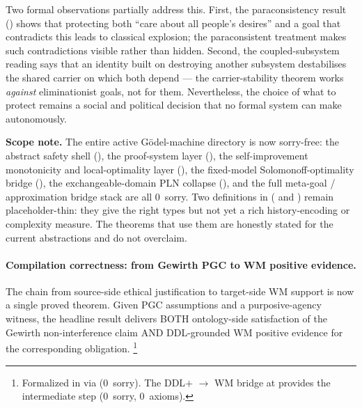 \documentclass[11pt,openany]{report}
\begin{document}
Two formal observations partially address this.  First, the paraconsistency
result () shows that protecting
both ``care about all people's desires'' and a goal that contradicts this
leads to classical explosion; the paraconsistent treatment makes such
contradictions visible rather than hidden.  Second, the coupled-subsystem
reading says that an identity built on destroying another subsystem
destabilises the shared carrier on which both depend --- the
carrier-stability theorem works \emph{against} eliminationist goals, not
for them.  Nevertheless, the choice of what to protect remains a social and
political decision that no formal system can make autonomously.

\noindent
\textbf{Scope note.}
The entire active G\"odel-machine directory is now sorry-free: the abstract
safety shell (), the proof-system layer
(), the self-improvement monotonicity and
local-optimality layer (), the fixed-model
Solomonoff-optimality bridge (), the
exchangeable-domain PLN collapse (), and the full
meta-goal / approximation bridge stack are all 0~sorry.
Two definitions in  ( and
) remain placeholder-thin: they give the right types
but not yet a rich history-encoding or complexity measure.  The theorems that
use them are honestly stated for the current abstractions and do not overclaim.

\paragraph{Compilation correctness: from Gewirth PGC to WM positive evidence.}

The chain from source-side ethical justification to target-side WM support is
now a single proved theorem.  Given PGC assumptions and a purposive-agency
witness, the headline result delivers BOTH ontology-side satisfaction of the
Gewirth non-interference claim AND DDL-grounded WM positive evidence for the
corresponding obligation.%
\footnote{Formalized in
via  (0~sorry).
The DDL$+$ $\to$ WM bridge at
provides the intermediate step
(0~sorry, 0~axioms).}
\end{document}
